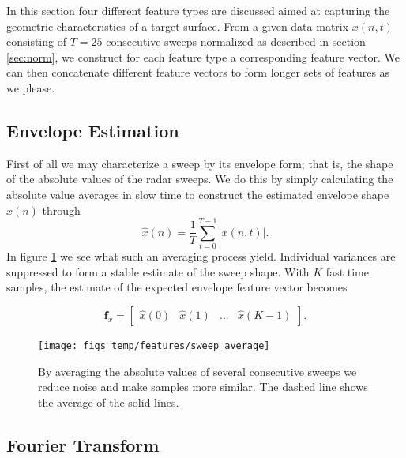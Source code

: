 In this section four different feature types are discussed aimed at capturing the geometric characteristics of a target surface. From a given data matrix $x(n,t)$ consisting of $T=25$ consecutive sweeps normalized as described in section \ref{sec:norm}, we construct for each feature type a corresponding feature vector. We can then concatenate different feature vectors to form longer sets of features as we please.  

\subsection{Envelope Estimation}

First of all we may characterize a sweep by its envelope form; that is, the shape of the absolute values of the radar sweeps. We do this by simply calculating the absolute value averages in slow time to construct the estimated envelope shape $\hat{x}(n)$ through
\begin{equation}
	\hat{x}(n) = \frac{1}{T}\sum_{t=0}^{T-1}|x(n, t)|.
\end{equation}
In figure \ref{fig:sweep_average} we see what such an averaging process yield. Individual variances are suppressed to form a stable estimate of the sweep shape. With $K$ fast time samples, the estimate of the expected envelope feature vector becomes 

\begin{equation}
	\mathbf{f}_{x} = 
	\begin{bmatrix}
		\hat{x}(0) & \hat{x}(1) & ... & \hat{x}(K-1)
	\end{bmatrix}.
\end{equation}


\begin{figure}[h]
	\centering
	\texttt{[image: figs\_temp/features/sweep\_average]}
	\caption{By averaging the absolute values of several consecutive sweeps we reduce noise and make samples more similar. The dashed line shows the average of the solid lines. }
	\label{fig:sweep_average}
\end{figure}


\subsection{Fourier Transform}

